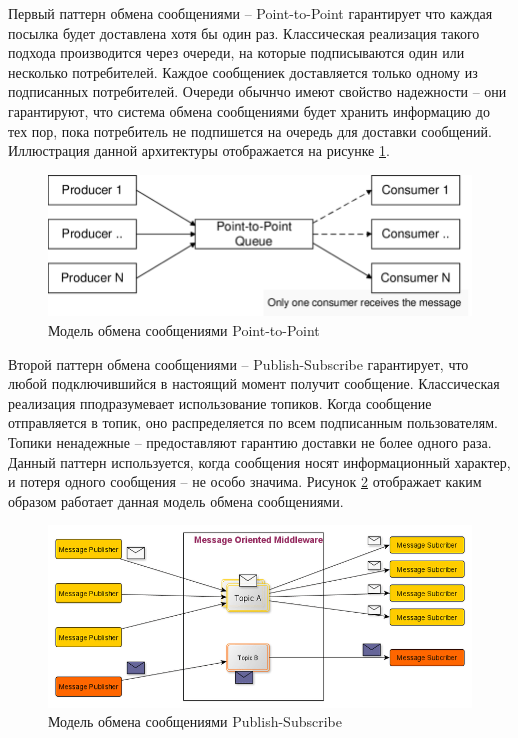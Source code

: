 Первый паттерн обмена сообщениями -- Point-to-Point гарантирует что каждая
посылка будет доставлена хотя бы один раз. Классическая реализация такого
подхода производится через очереди, на которые подписываются один или несколько
потребителей. Каждое сообщениек доставляется только одному из подписанных
потребителей. Очереди обычнчо имеют свойство надежности -- они гарантируют, что
система обмена сообщениями будет хранить информацию до тех пор, пока потребитель
не подпишется на очередь для доставки сообщений. Иллюстрация данной архитектуры
отображается на рисунке \ref{fig:ptp}.
\begin{figure}[H]
    \centering
    \includegraphics[scale=0.45]{inc/img/PTP-messaging-model.png}
    \caption{Модель обмена сообщениями Point-to-Point}
    \label{fig:ptp}
\end{figure}

Второй паттерн обмена сообщениями -- Publish-Subscribe гарантирует, что любой
подключившийся в настоящий момент получит сообщение. Классическая реализация
пподразумевает использование топиков. Когда сообщение отправляется в топик, оно
распределяется по всем подписанным пользователям. Топики ненадежные --
предоставляют гарантию доставки не более одного раза. Данный паттерн
используется, когда сообщения носят информационный характер, и потеря одного
сообщения -- не особо значима. Рисунок \ref{fig:pub-sub} отображает каким
образом работает данная модель обмена сообщениями.
\begin{figure}[H]
    \centering
    \includegraphics[scale=0.45]{inc/img/Publish-Subscribe-messaging-model.png}
    \caption{Модель обмена сообщениями Publish-Subscribe}
    \label{fig:pub-sub}
\end{figure}


